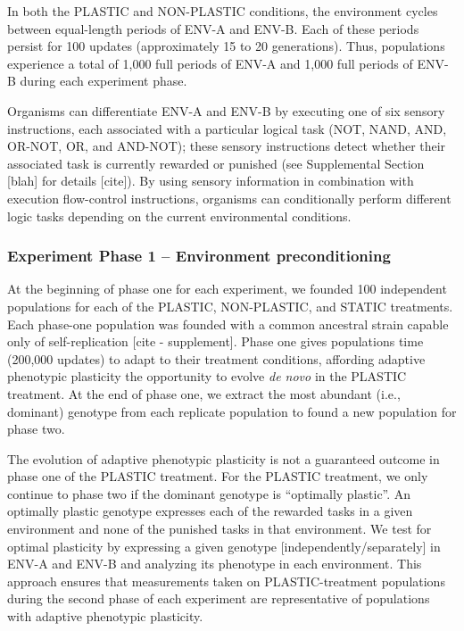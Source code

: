 In both the PLASTIC and NON-PLASTIC conditions, the environment cycles between equal-length periods of ENV-A and ENV-B.
Each of these periods persist for 100 updates (approximately 15 to 20 generations).
Thus, populations experience a total of 1,000 full periods of ENV-A and 1,000 full periods of ENV-B during each experiment phase.

Organisms can differentiate ENV-A and ENV-B by executing one of six sensory instructions, each associated with a particular logical task (NOT, NAND, AND, OR-NOT, OR, and AND-NOT); these sensory instructions detect whether their associated task is currently rewarded or punished (see Supplemental Section [blah] for details [cite]).
By using sensory information in combination with execution flow-control instructions, organisms can conditionally perform different logic tasks depending on the current environmental conditions.

\subsubsection{Experiment Phase 1 -- Environment preconditioning}
\label{sec:methods:experiment:phase-one}

At the beginning of phase one for each experiment, we founded 100 independent populations for each of the PLASTIC, NON-PLASTIC, and STATIC treatments.
Each phase-one population was founded with a common ancestral strain capable only of self-replication [cite - supplement].
Phase one gives populations time (200,000 updates) to adapt to their treatment conditions, affording adaptive phenotypic plasticity the opportunity to evolve \textit{de novo} in the PLASTIC treatment.
At the end of phase one, we extract the most abundant (i.e., dominant) genotype from each replicate population to found a new population for phase two.

The evolution of adaptive phenotypic plasticity is not a guaranteed outcome in phase one of the PLASTIC treatment.
For the PLASTIC treatment, we only continue to phase two if the dominant genotype is ``optimally plastic''.
An optimally plastic genotype expresses each of the rewarded tasks in a given environment and none of the punished tasks in that environment.
We test for optimal plasticity by expressing a given genotype [independently/separately] in ENV-A and ENV-B and analyzing its phenotype in each environment. %
This approach ensures that measurements taken on PLASTIC-treatment populations during the second phase of each experiment are representative of populations with adaptive phenotypic plasticity.


